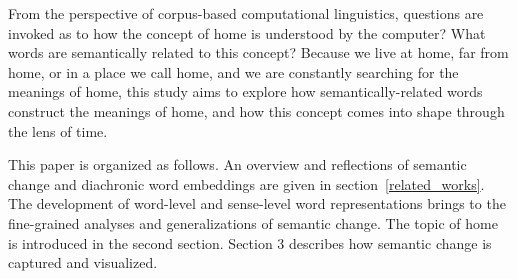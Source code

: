 From the perspective of corpus-based computational linguistics, questions are invoked as to how the concept of home is understood by the computer? What words are semantically related to this concept? Because we live at home, far from home, or in a place we call home, and we are constantly searching for the meanings of home, this study aims to explore how semantically-related words construct the meanings of home, and how this concept comes into shape through the lens of time.

This paper is organized as follows. An overview and reflections of semantic change and diachronic word embeddings are given in section~\ref{related_works}. The development of word-level and sense-level word representations brings to the fine-grained analyses and generalizations of semantic change. The topic of home is introduced in the second section. Section 3 describes how semantic change is captured and visualized.

